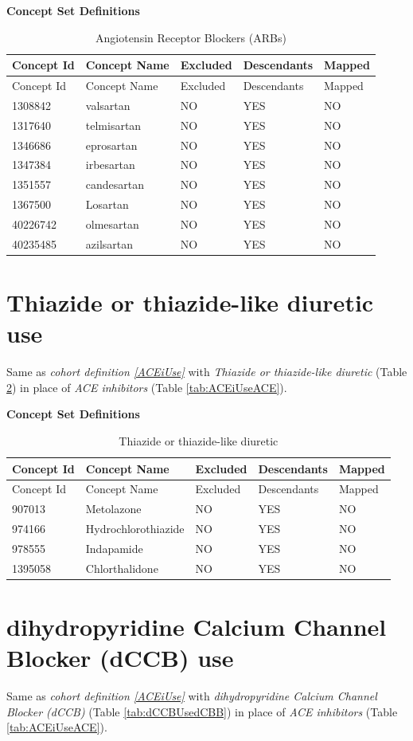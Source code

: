 \documentclass[11pt]{book}
\theoremstyle{definition}
\theoremstyle{definition}
\theoremstyle{definition}
\theoremstyle{remark}
\begin{document}
\textbf{Concept Set Definitions}

\begin{longtable}[]{@{}lllll@{}}
\caption{\label{tab:ARBUseARBs} Angiotensin Receptor Blockers (ARBs)}\tabularnewline
\toprule
Concept Id & Concept Name & Excluded & Descendants & Mapped\tabularnewline
\midrule
\endfirsthead
\toprule
Concept Id & Concept Name & Excluded & Descendants & Mapped\tabularnewline
\midrule
\endhead
1308842 & valsartan & NO & YES & NO\tabularnewline
1317640 & telmisartan & NO & YES & NO\tabularnewline
1346686 & eprosartan & NO & YES & NO\tabularnewline
1347384 & irbesartan & NO & YES & NO\tabularnewline
1351557 & candesartan & NO & YES & NO\tabularnewline
1367500 & Losartan & NO & YES & NO\tabularnewline
40226742 & olmesartan & NO & YES & NO\tabularnewline
40235485 & azilsartan & NO & YES & NO\tabularnewline
\bottomrule
\end{longtable}

\hypertarget{THZUse}{%
\section{Thiazide or thiazide-like diuretic use}\label{THZUse}}

Same as \emph{cohort definition \ref{ACEiUse}} with \emph{Thiazide or thiazide-like diuretic} (Table \ref{tab:THZUseTHZ}) in place of \emph{ACE inhibitors} (Table \ref{tab:ACEiUseACE}).

\textbf{Concept Set Definitions}

\begin{longtable}[]{@{}lllll@{}}
\caption{\label{tab:THZUseTHZ} Thiazide or thiazide-like diuretic}\tabularnewline
\toprule
Concept Id & Concept Name & Excluded & Descendants & Mapped\tabularnewline
\midrule
\endfirsthead
\toprule
Concept Id & Concept Name & Excluded & Descendants & Mapped\tabularnewline
\midrule
\endhead
907013 & Metolazone & NO & YES & NO\tabularnewline
974166 & Hydrochlorothiazide & NO & YES & NO\tabularnewline
978555 & Indapamide & NO & YES & NO\tabularnewline
1395058 & Chlorthalidone & NO & YES & NO\tabularnewline
\bottomrule
\end{longtable}

\hypertarget{dCCBUse}{%
\section{dihydropyridine Calcium Channel Blocker (dCCB) use}\label{dCCBUse}}

Same as \emph{cohort definition \ref{ACEiUse}} with \emph{dihydropyridine Calcium Channel Blocker (dCCB)} (Table \ref{tab:dCCBUsedCBB}) in place of \emph{ACE inhibitors} (Table \ref{tab:ACEiUseACE}).
\end{document}
